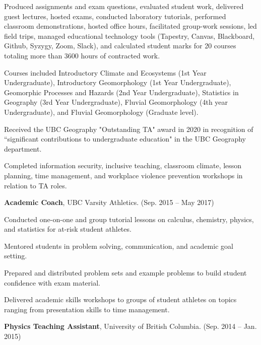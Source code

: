 \documentclass[11pt,letterpaper]{article}
\renewenvironment{itemize}{
	\begin{list}{}{
			\setlength{\leftmargin}{1.5em}
			\setlength{\rightmargin}{0em}  %
			\setlength{\itemsep}{0.25em}
			\setlength{\parskip}{0pt}
			\setlength{\parsep}{0.25em}
		}
	}{
	\end{list}
}
\newenvironment{itemizeit}
{\itemize\let\origitem\item
	\renewcommand{\item}[1][default]
	{\origitem[\tiny $\blacksquare$]}}
{\enditemize}
\renewenvironment{itemize}{
	\begin{list}{}{
			\setlength{\leftmargin}{1.5em}
			\setlength{\itemsep}{0.25em}
			\setlength{\parskip}{0pt}
			\setlength{\parsep}{0.25em}
		}
	}{
	\end{list}
}
\begin{document}
\begin{itemize}
\begin{itemizeit} %
	\item Produced assignments and exam questions, evaluated student work, delivered guest lectures, hosted exams, conducted laboratory tutorials, performed classroom demonstrations, hosted office hours, facilitated group-work sessions, led field trips, managed educational technology tools (Tapestry, Canvas, Blackboard, Github, Syzygy, Zoom, Slack), and calculated student marks for 20 courses totaling more than 3600 hours of contracted work.
	\item Courses included Introductory Climate and Ecosystems (1st Year Undergraduate), Introductory Geomorphology (1st Year Undergraduate), Geomorphic Processes and Hazards (2nd Year Undergraduate), Statistics in Geography (3rd Year Undergraduate), Fluvial Geomorphology (4th year Undergraduate), and Fluvial Geomorphology (Graduate level).
	\item Received the UBC Geography "Outstanding TA" award in 2020 in recognition of ``significant contributions to undergraduate education" in the UBC Geography department.
	\item Completed information security, inclusive teaching, classroom climate, lesson planning, time management, and workplace violence prevention workshops in relation to TA roles.
\end{itemizeit}

\item {\bf Academic Coach}, UBC Varsity Athletics. \hfill (Sep. 2015 -- May 2017)

\begin{itemizeit}
	\item Conducted one-on-one and group tutorial lessons on calculus, chemistry, physics, and statistics for at-risk student athletes.
	\item Mentored students in problem solving, communication, and academic goal setting.
	\item Prepared and distributed problem sets and example problems to build student confidence with exam material.
	\item Delivered academic skills workshops to groups of student athletes on topics ranging from presentation skills to time management.
\end{itemizeit}


\item {\bf Physics Teaching Assistant}, University of British Columbia. \hfill (Sep. 2014 -- Jan. 2015)


\end{itemize}
\end{document}
